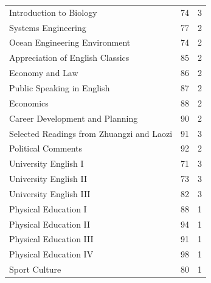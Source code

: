 \documentclass[a4paper,10pt]{article}
\begin{document}
\begin{center}
\begin{tabular}{lcc}
Introduction to Biology &74&    3\\
Systems Engineering     &77&    2\\
Ocean Engineering Environment   &74&    2\\
Appreciation of English Classics    &85&    2\\
Economy and Law &86&    2\\
Public Speaking in English &87& 2\\
Economics   &88&    2\\
Career Development and Planning &90&    2\\
Selected Readings from Zhuangzi and Laozi   &91&    3\\
Political Comments  &92&    2\\
University English I &71&   3\\
University English II &73&  3\\
University English III &82& 3\\
Physical Education I    &88& 1\\
Physical Education II   &94&    1\\
Physical Education III  &91&    1\\
Physical Education IV   &98&    1\\
Sport Culture           &80&    1\\
\end{tabular}
\end{center}
\end{document}
